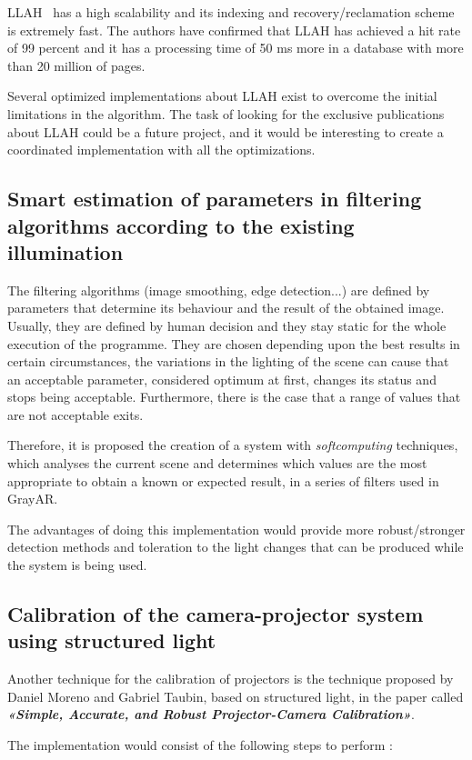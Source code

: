 LLAH~\cite{Nakai} has a high scalability and its indexing and recovery/reclamation scheme is extremely fast. The authors have confirmed that LLAH has achieved a hit rate of 99 percent and it has a processing time of 50 ms more in a database with more than 20 million of pages. 

Several optimized implementations about LLAH exist to overcome the initial limitations in the algorithm. The task of looking for the exclusive publications about LLAH could be a future project, and it would be interesting to create a coordinated implementation with all the optimizations.

\subsection{Smart estimation of parameters in filtering algorithms according to the existing illumination}
The filtering algorithms (image smoothing, edge detection...) are defined by parameters that determine its behaviour and the result of the obtained image. Usually, they are defined by human decision and they stay static for the whole execution of the programme. They are chosen depending upon the best results in certain circumstances, the variations in the lighting of the scene can cause that an acceptable parameter, considered optimum at first, changes its status and stops being acceptable. Furthermore, there is the case that a range of values that are not acceptable exits. 

Therefore, it is proposed the creation of a system with \textit{softcomputing} techniques, which analyses the current scene and determines which values are the most appropriate to obtain a known or expected result, in a series of filters used in GrayAR. 

The advantages of doing this implementation would provide more robust/stronger detection methods and toleration to the light changes that can be produced while the system is being used.

\subsection{Calibration of the camera-projector system using structured light}
Another technique for the calibration of projectors is the technique proposed by Daniel Moreno and Gabriel Taubin, based on structured light, in the paper called \textbf{\textit{«Simple, Accurate, and Robust Projector-Camera Calibration»}}. 

The implementation would consist of the following steps to perform \cite{Moreno}:

